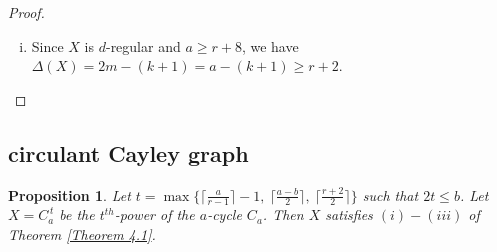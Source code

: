 \documentclass[12pt,reqno,a4paper]{amsart}
\theoremstyle{definition}
\newtheorem{prop}[defn]{Proposition}
\begin{document}
\begin{proof}
\begin{enumerate}[(i)]
Then $\{P_{0}\}\cup\{P_{t}:\rho^{r_{t}}\in R\backslash\{u,v\}\}\cup \{Q_{s}:s\in \rho^i F\cap\rho^j F, N_{X}(u)=\rho^{i}F, N_{X}(v)=\rho^{j}F\}$ is a collection of $(m-1)+(m-2k)=2m-(2k+1)$ internally vertex-disjoint paths.
 
\medskip\noindent\textbf{Case B: 
$u,v\in R\sigma$ are distinct reflections.} 
This is analogous to Case A. One only needs to swap the roles of rotations and reflections.

\medskip\noindent\textbf{Case C: $u$ is a rotation and $v$ is a reflection (or vice versa).} \\
Without loss of generality, assume $u=\rho^i$ and $v=\rho^j\sigma$ for some $i$ and $j$. 

\begin{itemize}
  \item[] \textsc{Subcase C(A):} Suppose $u$ and $v$ are adjacent. Consider the edge $uv$ as a path.   
  Since $v$ has $m-k$ neighbors in $R$, there are $m-(k+1)$ neighbors of $v$ in $R\backslash \{u\}$.
  For each such rotation $\rho^{r}\in R\setminus\{u\}$ (that is a neighbor of $v$) take the path $P_{\rho^{r}}=\{u\rho^{r},\rho^{r}v\}$.
  Similarly, there are $m-(k+1)$ different reflections distinct from $v$ that are neighbors of $u$. For each such reflection $s$, take the path $P_{s}=\{us, sv\}$. 
  Altogether, these give $1+2(m-(k+1))=2m-(2k+1)$ internally vertex disjoint paths from $u$ to $v$.
  \vspace{2mm}

  \item[] \textsc{Subcase C(B):} If $u$ is not a neighbor of $v$, then similar to \textsc{Subcase C(A)}, we can obtain at least $2m-(2k+1)$ internally vertex disjoint paths from $u$ to $v$.
\end{itemize}

\medskip
By Menger's theorem, $\kappa(X)\ge 2m-(2k+1)=a-(2k+1)> a-b$ since $b=2r-1>2k+1$.
    
    \item Since $X$ is $d$-regular and $a\geq r+8$, we have $\Delta(X)=2m-(k+1)=a-(k+1)\geq r+2$.
\end{enumerate}
\end{proof}

\subsection{circulant Cayley graph}

\begin{prop}\label{Proposition 4.5} 
{\em Let $t=\max\Big\{\Big\lceil\frac{a}{r-1}\Big\rceil-1,\ \Big\lceil\frac{a-b}{2}\Big\rceil,\ \Big\lceil\frac{r+2}{2}\Big\rceil\Big\}$ such that $2t\leq b$.
Let $X=C_a^{\,t}$ be the $t^{th}$-power of the $a$-cycle $C_{a}$. Then $X$ satisfies $(i)-(iii)$ of Theorem \ref{Theorem 4.1}.}
\end{prop}
\end{document}
